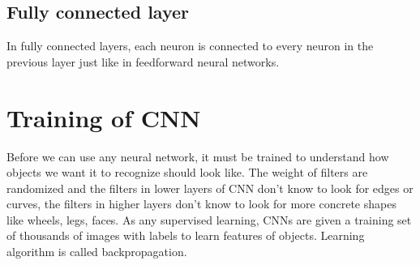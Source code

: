 \documentclass[twoside]{ctuthesis}
\theoremstyle{plain}
\theoremstyle{definition}
\theoremstyle{note}
\begin{document}
\subsection{Fully connected layer}
In fully connected layers, each neuron is connected to every neuron in the previous layer just like in feedforward neural networks.
\section{Training of CNN}
Before we can use any neural network, it must be trained to understand how objects we want it to recognize should look like. The weight of filters are randomized and the filters in lower layers of CNN don't know to look for edges or curves, the filters in higher layers don't know to look for more concrete shapes like wheels, legs, faces. As any supervised learning, CNNs are given a training set of thousands of images with labels to learn features of objects. Learning algorithm is called backpropagation.
\end{document}
